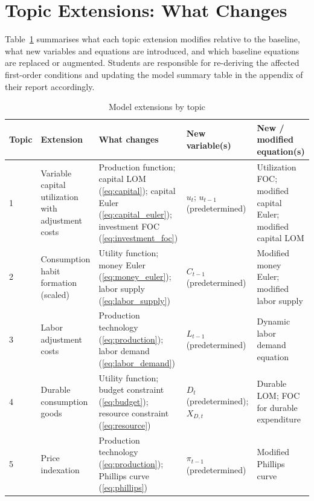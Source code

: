 \documentclass[11pt, a4paper]{article}
\begin{document}
\section{Topic Extensions: What Changes}

Table~\ref{tab:extensions} summarises what each topic extension modifies
relative to the baseline, what new variables and equations are introduced, and
which baseline equations are replaced or augmented. Students are responsible for
re-deriving the affected first-order conditions and updating the model summary
table in the appendix of their report accordingly.

\begin{table}[h!]
\centering
\caption{Model extensions by topic}
\label{tab:extensions}
\begin{tabular}{p{1.1cm} p{3.0cm} p{3.8cm} p{2.8cm} p{3.2cm}}
\toprule
\textbf{Topic} & \textbf{Extension} & \textbf{What changes} &
\textbf{New variable(s)} & \textbf{New / modified equation(s)} \\
\midrule
1
  & Variable capital utilization with adjustment costs
  & Production function; capital LOM (\ref{eq:capital}); capital Euler
    (\ref{eq:capital_euler}); investment FOC (\ref{eq:investment_foc})
  & $u_t$; $u_{t-1}$ (predetermined)
  & Utilization FOC; modified capital Euler; modified
    capital LOM \\[0.5em]
2
  & Consumption habit formation (scaled)
  & Utility function; money Euler (\ref{eq:money_euler}); labor supply
    (\ref{eq:labor_supply})
  & $C_{t-1}$ (predetermined)
  & Modified money Euler; modified labor supply \\[0.5em]
3
  & Labor adjustment costs
  & Production technology (\ref{eq:production}); labor demand
    (\ref{eq:labor_demand})
  & $L_{t-1}$ (predetermined)
  & Dynamic labor demand equation \\[0.5em]
4
  & Durable consumption goods
  & Utility function; budget constraint (\ref{eq:budget}); resource
    constraint (\ref{eq:resource})
  & $D_t$ (predetermined); $X_{D,t}$
  & Durable LOM; FOC for durable expenditure \\[0.5em]
5
  & Price indexation
  & Production technology (\ref{eq:production}); Phillips curve
    (\ref{eq:phillips})
  & $\pi_{t-1}$ (predetermined)
  & Modified Phillips curve \\
\bottomrule
\end{tabular}
\end{table}
\end{document}
